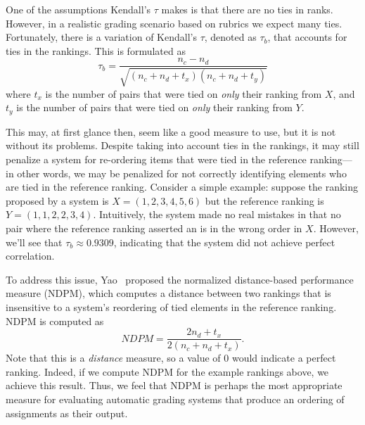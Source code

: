 One of the assumptions Kendall's $\tau$ makes is that there are no ties in
ranks. However, in a realistic grading scenario based on rubrics we expect
many ties. Fortunately, there is a variation of Kendall's $\tau$, denoted
as $\tau_b$, that accounts for ties in the rankings. This is formulated as
\[
    \tau_b = \frac{n_c - n_d}{\sqrt{(n_c + n_d + t_x)(n_c + n_d + t_y)}}
\]
where $t_x$ is the number of pairs that were tied on \emph{only} their
ranking from $X$, and $t_y$ is the number of pairs that were tied on
\emph{only} their ranking from $Y$.

This may, at first glance then, seem like a good measure to use, but it is
not without its problems. Despite taking into account ties in the rankings,
it may still penalize a system for re-ordering items that were tied in the
reference ranking---in other words, we may be penalized for not correctly
identifying elements who are tied in the reference ranking. Consider a
simple example: suppose the ranking proposed by a system is $X =
(1,2,3,4,5,6)$ but the reference ranking is $Y = (1,1,2,2,3,4)$.
Intuitively, the system made no real mistakes in that no pair where the
reference ranking asserted an is in the wrong order in $X$. However, we'll
see that $\tau_b \approx 0.9309$, indicating that the system did not achieve
perfect correlation.

To address this issue, Yao~\cite{Yao:1995:JASIS} proposed the normalized
distance-based performance measure (NDPM), which computes a distance
between two rankings that is insensitive to a system's reordering of tied
elements in the reference ranking. NDPM is computed as
\[
    NDPM = \frac{2n_d + t_x}{2(n_c + n_d + t_x)}.
\]
Note that this is a \emph{distance} measure, so a value of $0$ would
indicate a perfect ranking. Indeed, if we compute NDPM for the example
rankings above, we achieve this result. Thus, we feel that NDPM is perhaps
the most appropriate measure for evaluating automatic grading systems that
produce an ordering of assignments as their output.


